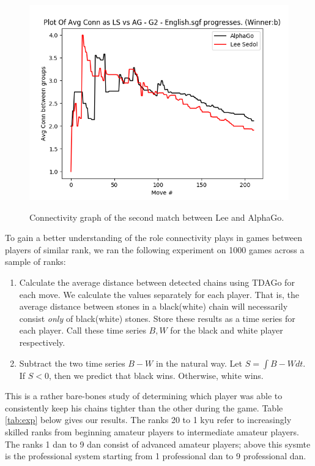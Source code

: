 \documentclass[11pt]{article}
\begin{document}
\begin{figure}[ht]
  \centering
  \includegraphics[scale=0.5]{lsdconn1.png}
  \label{fig:lsdconn1}
  \caption{Connectivity graph of the second match between Lee and AlphaGo.}
\end{figure}

To gain a better understanding of the role connectivity plays in games between players of similar rank, we ran the following experiment on 1000 games across a sample of ranks:

\begin{enumerate}
  \item Calculate the average distance between detected chains using TDAGo for each move. We calculate the values separately for each player. That is, the average distance between stones in a black(white) chain will necessarily consist \textit{only} of black(white) stones. Store these results as a time series for each player. Call these time series $B,W$ for the black and white player respectively.
  \item Subtract the two time series $B-W$ in the natural way. Let $S = \int B-W dt$. If $S < 0$, then we predict that black wins. Otherwise, white wins.
\end{enumerate}

This is a rather bare-bones study of determining which player was able to consistently keep his chains tighter than the other during the game. Table \ref{tab:exp} below gives our results. The ranks 20 to 1 kyu refer to increasingly skilled ranks from beginning amateur players to intermediate amateur players. The ranks 1 dan to 9 dan consist of advanced amateur players; above this sysmte is the professional system starting from 1 professional dan to 9 professional dan.
\end{document}
